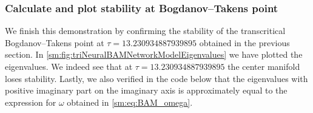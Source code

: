 \subsubsection{Calculate and plot stability at Bogdanov--Takens point}
We finish this demonstration by confirming the stability
of the transcritical Bogdanov--Takens point at $\tau = 13.230934887939895$
obtained in the previous section. In \cref{sm:fig:triNeuralBAMNetworkModelEigenvalues}
we have plotted the eigenvalues. We indeed see that at $\tau = 13.230934887939895$
the center manifold loses stability. Lastly, we also verified in the code
below that the eigenvalues with positive imaginary part on the imaginary axis
is approximately equal to the expression for $\omega$ obtained in \cref{sm:eq:BAM_omega}. 
\inputminted[firstline=459, lastline=467]{julia}{\pathToJuliaFiles/triNeuralBAMNetworkModel_simulation_article.jl}